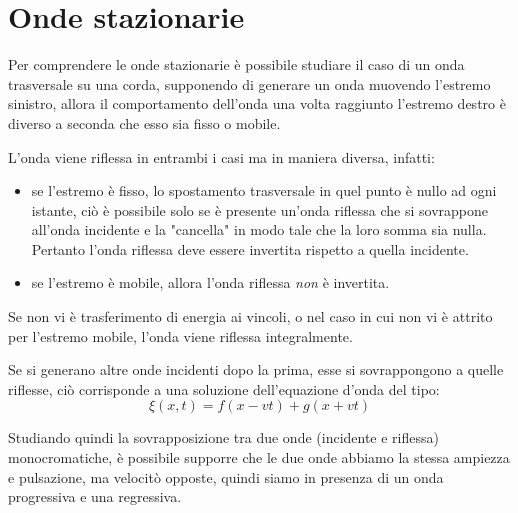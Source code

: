 \documentclass[11pt, a4paper, openright]{book}
\theoremstyle{plain}
\theoremstyle{definition}
\begin{document}
\newpage

\section{Onde stazionarie}
Per comprendere le onde stazionarie è possibile studiare il caso di un onda trasversale su una corda, supponendo di generare un onda muovendo l'estremo sinistro, allora il comportamento dell'onda una volta raggiunto l'estremo destro è diverso a seconda che esso sia fisso o mobile.

L'onda viene riflessa in entrambi i casi ma in maniera diversa, infatti:
\begin{itemize}
    \item se l'estremo è fisso, lo spostamento trasversale in quel punto è nullo ad ogni istante, ciò è possibile solo se è presente un'onda riflessa che si sovrappone all'onda incidente e la "cancella" in modo tale che la loro somma sia nulla. Pertanto l'onda riflessa deve essere invertita rispetto a quella incidente.
    \item se l'estremo è mobile, allora l'onda riflessa \textit{non} è invertita.
\end{itemize}

Se non vi è trasferimento di energia ai vincoli, o nel caso in cui non vi è attrito per l'estremo mobile, l'onda viene riflessa integralmente.

Se si generano altre onde incidenti dopo la prima, esse si sovrappongono a quelle riflesse, ciò corrisponde a una soluzione dell'equazione d'onda del tipo:
\begin{equation}
    \xi(x, t) = f(x - vt) + g(x + vt)
\end{equation}

Studiando quindi la sovrapposizione tra due onde (incidente e riflessa) monocromatiche, è possibile supporre che le due onde abbiamo la stessa ampiezza e pulsazione, ma velocitò opposte, quindi siamo in presenza di un onda progressiva e una regressiva.
\end{document}
